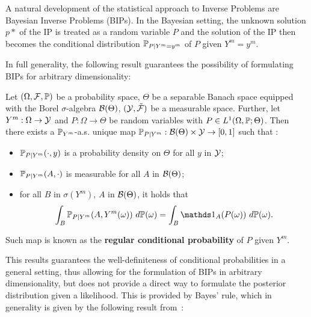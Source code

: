 A natural development of the statistical approach to Inverse Problems are Bayesian Inverse Problems (BIPs). 
In the Bayesian setting, the unknown solution $p*$ of the IP is treated as a random variable $P$ and the solution of the IP then becomes the conditional distribution $\mathbb P_{P \mid Y^m=y^m} $ of $P$ given $Y^m=y^m$.

In full generality, the following result guarantees the possibility of formulating BIPs for arbitrary dimensionality:
\begin{thm} 
    Let $ (\Omega, \mathcal F , \mathbb P) $ be a probability space, $\Theta$ be a separable Banach space equipped with the Borel $\sigma$-algebra $\mathcal B (\Theta)$, $(\mathcal Y, \tilde{\mathcal F})$ be a measurable space.
    Further, let $Y^m:\Omega \rightarrow \mathcal Y$ and $P : \Omega \rightarrow \Theta$ be random variables with $P \in L^1(\Omega, \mathbb P; \Theta) $. \newline
    Then there exists a $\mathbb P_{Y^m}$-a.s. unique map $\mathbb P_{P \mid Y^m} : \mathcal B (\Theta) \times \mathcal Y \rightarrow [0,1] $ such that :
    \begin{itemize}
        \item $\mathbb P_{P \mid Y^m}(\cdot, y)$ is a probability density on $\Theta$ for all $y$ in $\mathcal Y$;
        \item $\mathbb P_{P \mid Y^m}(A, \cdot)$ is measurable for all $A$ in $\mathcal B (\Theta)$;
        \item for all $B$ in $\sigma(Y^m)$, $A$ in $\mathcal B (\Theta)$, it holds that
                \[ 
                \int_B \bb P_{P \mid Y^m}(A, Y^m(\omega)) \ d\bb P(\omega)= \int_B \ind_A(P(\omega)) \ d\bb P(\omega).
                \] 
    \end{itemize}
    Such map is known as the \textbf{regular conditional probability} of $P$ given $Y^m$.
\end{thm}

This results guarantees the well-definiteness of conditional probabilities in a general setting, thus allowing for the formulation of BIPs in arbitrary dimensionality, but does not provide a direct way to formulate the posterior distribution given a likelihood. 
This is provided by Bayes' rule, which in generality is given by the following result from~\cite[Theorem 14]{DashtiStuart2017}:


